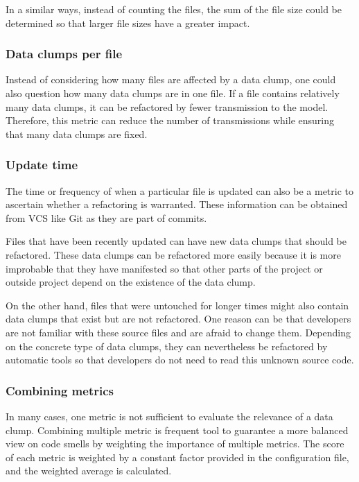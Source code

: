 In a similar ways, instead of counting the files, the sum of the file size could be determined so that larger file sizes have a greater impact.

\subsubsection{Data clumps per file}

Instead of considering how many files are affected by a data clump, one could also question how many data clumps are in one file. If a file contains relatively many data clumps, it can be refactored by fewer transmission to the model. Therefore, this metric can reduce the number of transmissions while ensuring that many data clumps are fixed. 

\subsubsection{Update time}

The time or frequency of when a particular file is updated can also be a metric to ascertain whether a refactoring is warranted. These information can be obtained from \ac{VCS} like Git as they are part of commits.

Files that have been recently updated can have new data clumps that should be refactored. These data clumps can be refactored more easily because it is more improbable that they have manifested so that other parts of the project or outside project depend on the existence of the data clump. 

On the other hand, files that were untouched for longer times might also contain data clumps that exist but are not refactored. One reason can be that developers are not familiar with these source files and are afraid to change them. Depending on the concrete type of data clumps, they can nevertheless be refactored by automatic tools so that developers do not need to read this unknown source code.


\subsubsection{Combining metrics}

In many cases, one metric is not sufficient to evaluate the relevance of a data clump. Combining multiple metric is frequent tool to guarantee a more balanced view on code smells by weighting the importance of multiple metrics. The score of each metric is weighted by a constant factor provided in the configuration file, and the weighted average is calculated. 

